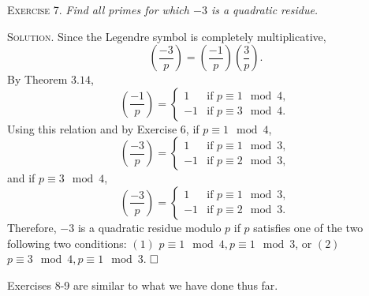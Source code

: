 \documentclass[11pt, leqno]{article}
\newcommand{\done}{\ensuremath{\hfill\square}}
\begin{document}
\textsc{Exercise 7}. \emph{Find all primes for which $-3$ is a quadratic residue.}

\textsc{Solution}. Since the Legendre symbol is completely multiplicative, 
\begin{displaymath}
\left( \frac{-3}{p} \right) = \left( \frac{-1}{p} \right) \left( \frac{3}{p} \right).
\end{displaymath}
By Theorem $3.14$, 
\begin{displaymath}
\left( \frac{-1}{p} \right) =
\begin{cases}
  1 & \text{if } p \equiv 1 \mod 4, \\
  -1 & \text{if } p \equiv 3 \mod 4.
\end{cases}
\end{displaymath}
Using this relation and by Exercise $6$, if $p \equiv 1 \mod 4$, 
\begin{displaymath}
  \left( \frac{-3}{p} \right) =
  \begin{cases}
    1 & \text{if } p \equiv 1 \mod 3,\\
    -1 & \text{if } p \equiv 2 \mod 3,
  \end{cases}
\end{displaymath}
and if $p \equiv 3 \mod 4$, 
\begin{displaymath}
  \left( \frac{-3}{p} \right) =
  \begin{cases}
    1 & \text{if } p \equiv 1 \mod 3,\\
    -1 & \text{if } p \equiv 2 \mod 3.
  \end{cases}
\end{displaymath}
Therefore, $-3$ is a quadratic residue modulo $p$ if $p$ satisfies one of the two following two conditions: $(1)$ $p \equiv 1 \mod 4, p \equiv 1 \mod 3$, or $(2)$ $p \equiv 3 \mod 4, p \equiv 1 \mod 3$. \done

Exercises 8-9 are similar to what we have done thus far.
\end{document}
